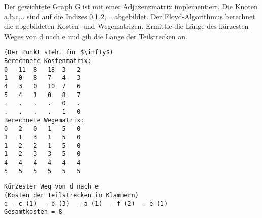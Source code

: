 ﻿\question[4]

Der gewichtete Graph G ist mit einer Adjazenzmatrix implementiert.
Die Knoten a,b,c,.. sind auf die Indizes 0,1,2,... abgebildet.
Der Floyd-Algorithmus berechnet die abgebildeten Kosten- und Wegematrizen.
Ermittle die Länge des kürzesten Weges von d nach e und gib die Länge der Teilstrecken an.
\begin{lstlisting}
(Der Punkt steht für $\infty$)
Berechnete Kostenmatrix:
0   11  8   18  3   2
1   0   8   7   4   3
4   3   0   10  7   6
5   4   1   0   8   7
.   .   .   .   0   .
.   .   .   .   1   0
Berechnete Wegematrix:
0   2   0   1   5   0
1   1   3   1   5   0
1   2   2   1   5   0
1   2   3   3   5   0
4   4   4   4   4   4
5   5   5   5   5   5
\end{lstlisting}

\begin{solutionbox}{4cm}

\begin{lstlisting}
Kürzester Weg von d nach e
(Kosten der Teilstrecken in Klammern)
d - c (1)  - b (3)  - a (1)  - f (2)  - e (1)
Gesamtkosten = 8
\end{lstlisting}
\end{solutionbox}

